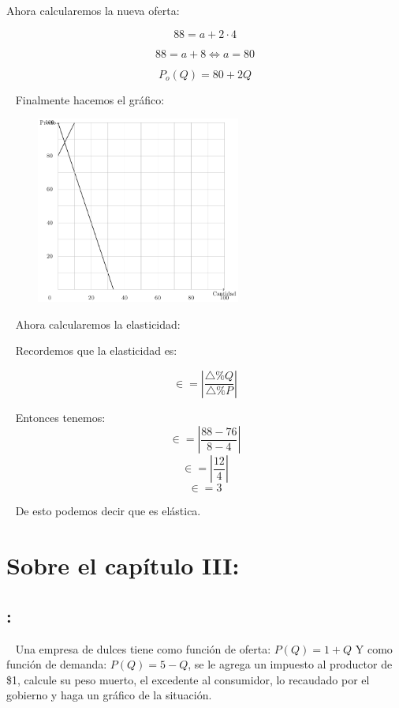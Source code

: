 \documentclass[
  letterpaper,
  DIV=11,
  numbers=noendperiod]{scrreport}
\begin{document}
Ahora calcularemos la nueva oferta:

\[
88=a+2\cdot 4
\]

\[
88=a+8 \Leftrightarrow a=80
\]

\[
P_o(Q)=80+2Q
\]

~ Finalmente hacemos el gráfico:

\begin{figure}

{\centering \includegraphics[width=0.6\textwidth,height=\textheight]{8ej_pauta_files/figure-pdf/unnamed-chunk-9-1.pdf}

}

\end{figure}

~ Ahora calcularemos la elasticidad:

~ Recordemos que la elasticidad es:

\[
\in =\left|\dfrac{\triangle\%Q}{\triangle\%P} \right|
\]

~ Entonces tenemos: \[
\in=\left|\frac{88-76}{8-4} \right|
\] \[
\in=\left|\frac{12}{4} \right|
\] \[
\in=3
\]

~ De esto podemos decir que es elástica.

\hypertarget{sobre-el-capuxedtulo-iii-1}{%
\section{Sobre el capítulo III:}\label{sobre-el-capuxedtulo-iii-1}}

\hypertarget{section-29}{%
\subsection{:}\label{section-29}}

~ Una empresa de dulces tiene como función de oferta: \(P(Q)=1+Q\) Y
como función de demanda: \(P(Q)=5-Q\), se le agrega un impuesto al
productor de \$1, calcule su peso muerto, el excedente al consumidor, lo
recaudado por el gobierno y haga un gráfico de la situación.
\end{document}
